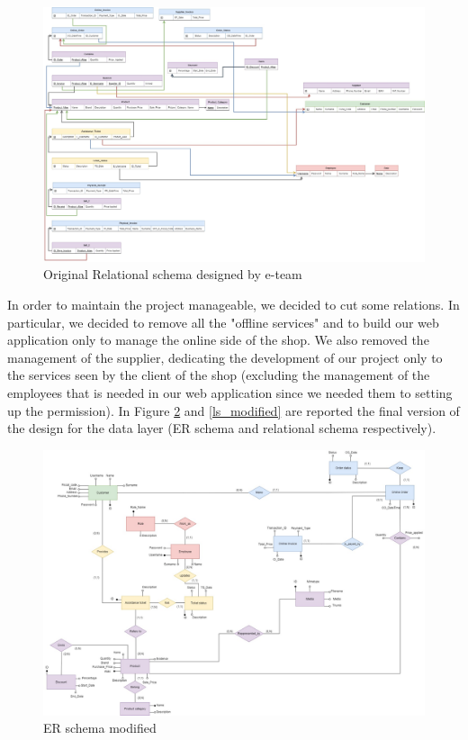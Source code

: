 \begin{figure}[H]
\centering
\includegraphics[width=16.5cm]{Schemas/LogicRS_original.jpg}
\caption{Original Relational schema designed by e-team}
\label{ls_original}
\end{figure}
\restoregeometry
In order to maintain the project manageable, we decided to cut some relations. In particular, we decided to remove all the "offline services" and to build our web application only to manage the online side of the shop.
We also removed the management of the supplier, dedicating the development of our project only to the services seen by the client of the shop (excluding the management of the employees that is needed in our web application since we needed them to setting up the permission). In Figure \ref{er_modified} and \ref{ls_modified} are reported the final version of the design for the data layer (ER schema and relational schema respectively).

\begin{figure}[H]
\centering
\includegraphics[width=16.5cm]{Schemas/ER_modified.jpg}
\caption{ER schema modified}
\label{er_modified}
\end{figure}

